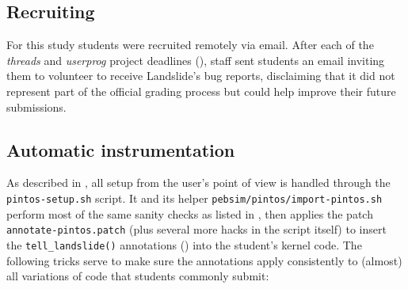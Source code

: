 \subsection{Recruiting}

For this study students were recruited remotely via email.
After each of the {\em threads} and {\em userprog} project deadlines (\sect{\ref{sec:overview-pintos}}),
\uchos staff sent students an email inviting them to volunteer to receive Landslide's bug reports,
disclaiming that it did not represent part of the official grading process but could help improve their future submissions.

\subsection{Automatic instrumentation}
\label{sec:education-pintos-instrumentation}

As described in \sect{\ref{sec:landslide-setup}},
all setup from the user's point of view is handled through the {\tt pintos-setup.sh} script.
It
and its helper {\tt pebsim/pintos/import-pintos.sh}
perform most of the same sanity checks as listed in \sect{\ref{sec:education-pebbles-instrumentation}},
then applies the patch {\tt annotate-\allowbreak{}pintos.patch}
(plus several more hacks in the script itself)
to insert the {\tt tell\_landslide()} annotations (\sect{\ref{sec:tell-landslide}})
into the student's kernel code.
The following tricks serve to make sure the annotations apply consistently
to (almost) all variations of code that students commonly submit:

